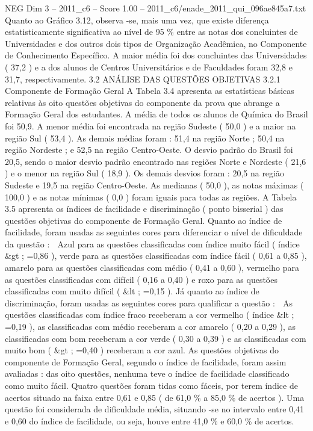 \begin{textsample}{NEG Dim 3 – 2011\_c6 – Score 1.00 – 2011\_c6/enade\_2011\_qui\_096ae845a7.txt}
Quanto ao Gráfico 3.12, observa -se, mais uma vez, que existe diferença estatisticamente significativa ao nível de 95 \% entre as notas dos concluintes de Universidades e dos outros dois tipos de Organização Acadêmica, no Componente de Conhecimento Específico.
A maior média foi dos concluintes das Universidades ( 37,2 ) e a dos alunos de Centros Universitários e de Faculdades foram 32,8 e 31,7, respectivamente. 3.2 ANÁLISE DAS QUESTÕES OBJETIVAS 3.2.1 Componente de Formação Geral A Tabela 3.4 apresenta as estatísticas básicas relativas às oito questões objetivas do componente da prova que abrange a Formação Geral dos estudantes.
A média de todos os alunos de Química do Brasil foi 50,9.
A menor média foi encontrada na região Sudeste ( 50,0 ) e a maior na região Sul ( 53,4 ).
As demais médias foram : 51,4 na região Norte ; 50,4 na região Nordeste ; e 52,5 na região Centro-Oeste.
O desvio padrão do Brasil foi 20,5, sendo o maior desvio padrão encontrado nas regiões Norte e Nordeste ( 21,6 ) e o menor na região Sul ( 18,9 ).
Os demais desvios foram : 20,5 na região Sudeste e 19,5 na região Centro-Oeste.
As medianas ( 50,0 ), as notas máximas ( 100,0 ) e as notas mínimas ( 0,0 ) foram iguais para todas as regiões.
A Tabela 3.5 apresenta os índices de facilidade e discriminação ( ponto bisserial ) das questões objetivas do componente de Formação Geral.
Quanto ao índice de facilidade, foram usadas as seguintes cores para diferenciar o nível de dificuldade da questão :  Azul para as questões classificadas com índice muito fácil ( índice \&gt ; =0,86 ), verde para as questões classificadas com índice fácil ( 0,61 a 0,85 ), amarelo para as questões classificadas com médio ( 0,41 a 0,60 ), vermelho para as questões classificadas com difícil ( 0,16 a 0,40 ) e roxo para as questões classificadas com muito difícil ( \&lt ; =0,15 ).
Já quanto ao índice de discriminação, foram usadas as seguintes cores para qualificar a questão :  As questões classificadas com índice fraco receberam a cor vermelho ( índice \&lt ; =0,19 ), as classificadas com médio receberam a cor amarelo ( 0,20 a 0,29 ), as classificadas com bom receberam a cor verde ( 0,30 a 0,39 ) e as classificadas com muito bom ( \&gt ; =0,40 ) receberam a cor azul.
As questões objetivas do componente de Formação Geral, segundo o índice de facilidade, foram assim avaliadas : das oito questões, nenhuma teve o índice de facilidade classificado como muito fácil.
Quatro questões foram tidas como fáceis, por terem índice de acertos situado na faixa entre 0,61 e 0,85 ( de 61,0 \% a 85,0 \% de acertos ).
Uma questão foi considerada de dificuldade média, situando -se no intervalo entre 0,41 e 0,60 do índice de facilidade, ou seja, houve entre 41,0 \% e 60,0 \% de acertos.

\end{textsample}
